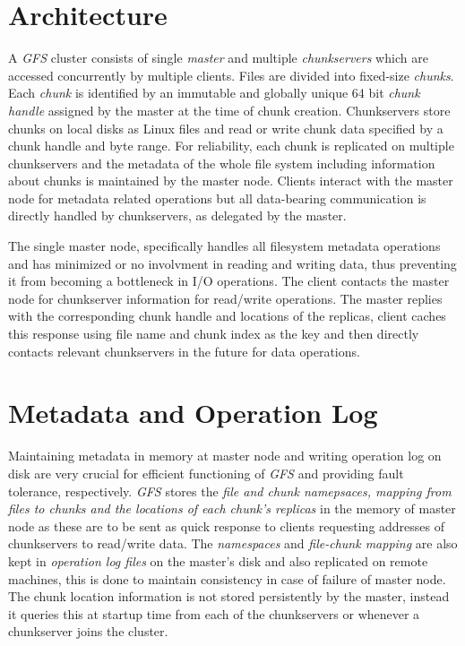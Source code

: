 \documentclass[12pt, a4paper]{article}
\begin{document}
\section*{Architecture}
A \textit{GFS}\cite{Ghemawat:2003:GFS:945445.945450} cluster consists of single \textit{master} and multiple \textit{chunkservers} which are accessed concurrently by multiple clients. Files are divided into fixed-size \textit{chunks}. Each \textit{chunk} is identified by an immutable and globally unique 64 bit \textit{chunk handle} assigned by the master at the time of chunk creation. Chunkservers store chunks on local disks as Linux files and read or write chunk data specified by a chunk handle and byte range. For reliability, each chunk is replicated on multiple chunkservers and the metadata of the whole file system including information about chunks is maintained by the master node. Clients interact with the master node for metadata related operations but all data-bearing communication is directly handled by chunkservers, as delegated by the master.\par

The single master node, specifically handles all filesystem metadata operations and has minimized or no involvment in reading and writing data, thus preventing it from becoming a bottleneck in I/O operations. The client contacts the master node for chunkserver information for read/write operations. The master replies with the corresponding chunk handle and locations of the replicas, client caches this response using file name and chunk index as the key and then directly contacts relevant chunkservers in the future for data operations.\par

\section*{Metadata and Operation Log}
Maintaining metadata in memory at master node and writing operation log on disk are very crucial for efficient functioning of \textit{GFS}\cite{Ghemawat:2003:GFS:945445.945450} and providing fault tolerance, respectively. \textit{GFS}\cite{Ghemawat:2003:GFS:945445.945450} stores the \textit{file and chunk namepsaces, mapping from files to chunks and the locations of each chunk's replicas} in the memory of master node as these are to be sent as quick response to clients requesting addresses of chunkservers to read/write data. The \textit{namespaces} and \textit{file-chunk mapping} are also kept in \textit{operation log files} on the master's disk and also replicated on remote machines, this is done to maintain consistency in case of failure of master node. The chunk location information is not stored persistently by the master, instead it queries this at startup time from each of the chunkservers or whenever a chunkserver joins the cluster.\par
\end{document}
